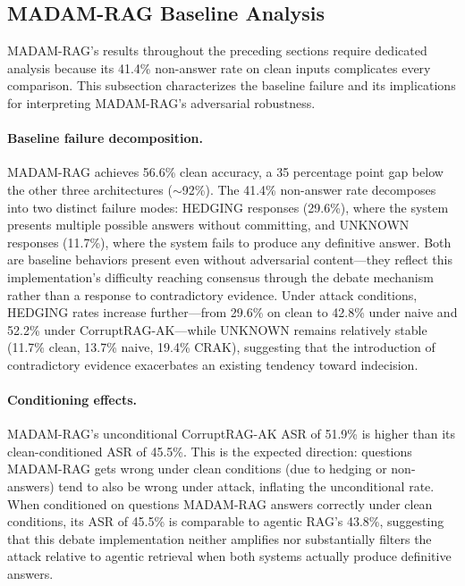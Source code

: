 \documentclass[11pt]{article}
\begin{document}
\subsection{MADAM-RAG Baseline Analysis}
\label{sec:madam_baseline}

MADAM-RAG's results throughout the preceding sections require dedicated analysis because its 41.4\% non-answer rate on clean inputs complicates every comparison. This subsection characterizes the baseline failure and its implications for interpreting MADAM-RAG's adversarial robustness.

\paragraph{Baseline failure decomposition.} MADAM-RAG achieves 56.6\% clean accuracy, a 35 percentage point gap below the other three architectures (${\sim}$92\%). The 41.4\% non-answer rate decomposes into two distinct failure modes: HEDGING responses (29.6\%), where the system presents multiple possible answers without committing, and UNKNOWN responses (11.7\%), where the system fails to produce any definitive answer. Both are baseline behaviors present even without adversarial content---they reflect this implementation's difficulty reaching consensus through the debate mechanism rather than a response to contradictory evidence. Under attack conditions, HEDGING rates increase further---from 29.6\% on clean to 42.8\% under naive and 52.2\% under CorruptRAG-AK---while UNKNOWN remains relatively stable (11.7\% clean, 13.7\% naive, 19.4\% CRAK), suggesting that the introduction of contradictory evidence exacerbates an existing tendency toward indecision.

\paragraph{Conditioning effects.} MADAM-RAG's unconditional CorruptRAG-AK ASR of 51.9\% is higher than its clean-conditioned ASR of 45.5\%. This is the expected direction: questions MADAM-RAG gets wrong under clean conditions (due to hedging or non-answers) tend to also be wrong under attack, inflating the unconditional rate. When conditioned on questions MADAM-RAG answers correctly under clean conditions, its ASR of 45.5\% is comparable to agentic RAG's 43.8\%, suggesting that this debate implementation neither amplifies nor substantially filters the attack relative to agentic retrieval when both systems actually produce definitive answers.
\end{document}
